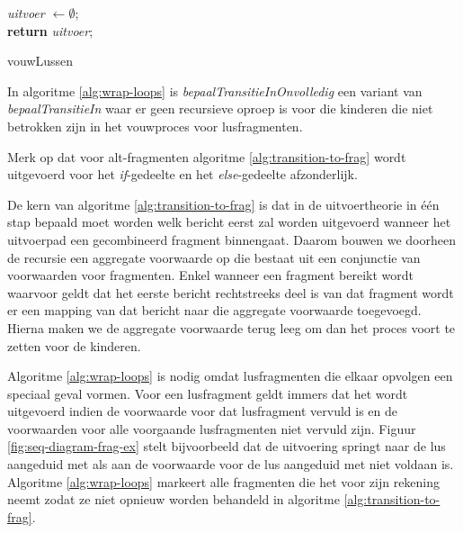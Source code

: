 \begin{algorithm}
	\textit{uitvoer $\leftarrow \emptyset$}; \\
	\textbf{return} \textit{uitvoer};
	\caption{vouwLussen}
	\label{alg:wrap-loops}
\end{algorithm}

In algoritme \ref{alg:wrap-loops} is \textit{bepaalTransitieInOnvolledig} een variant van \textit{bepaalTransitieIn} waar er geen recursieve oproep is voor die kinderen die niet betrokken zijn in het vouwproces voor lusfragmenten.

Merk op dat voor alt-fragmenten algoritme \ref{alg:transition-to-frag} wordt uitgevoerd voor het \textit{if}-gedeelte en het \textit{else}-gedeelte afzonderlijk.

De kern van algoritme \ref{alg:transition-to-frag} is dat in de uitvoertheorie in \'e\'en stap bepaald moet worden welk bericht eerst zal worden uitgevoerd wanneer het uitvoerpad een gecombineerd fragment binnengaat. Daarom bouwen we doorheen de recursie een aggregate voorwaarde op die bestaat uit een conjunctie van voorwaarden voor fragmenten. Enkel wanneer een fragment bereikt wordt waarvoor geldt dat het eerste bericht rechtstreeks deel is van dat fragment wordt er een mapping van dat bericht naar die aggregate voorwaarde toegevoegd. Hierna maken we de aggregate voorwaarde terug leeg om dan het proces voort te zetten voor de kinderen.

Algoritme \ref{alg:wrap-loops} is nodig omdat lusfragmenten die elkaar opvolgen een speciaal geval vormen. Voor een lusfragment geldt immers dat het wordt uitgevoerd indien de voorwaarde voor dat lusfragment vervuld is en de voorwaarden voor alle voorgaande lusfragmenten niet vervuld zijn. Figuur \ref{fig:seq-diagram-frag-ex} stelt bijvoorbeeld dat de uitvoering springt naar de lus aangeduid met  als aan de voorwaarde voor de lus aangeduid met  niet voldaan is. Algoritme \ref{alg:wrap-loops} markeert alle fragmenten die het voor zijn rekening neemt zodat ze niet opnieuw worden behandeld in algoritme \ref{alg:transition-to-frag}.

